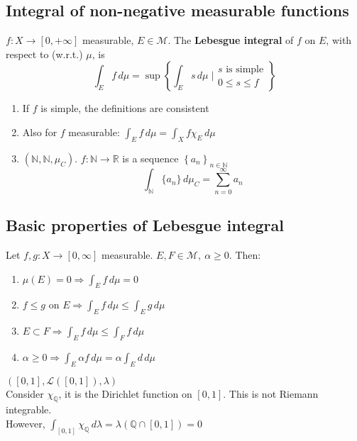 \subsection{Integral of non-negative measurable functions}
\begin{definition}
    \(f:X \to [0, +\infty]\) measurable, \(E \in \mathcal{M}\). The \textbf{Lebesgue integral} of \(f\) on \(E\), with respect to (w.r.t.) \(\mu\), is 
    \[
        \int_E f \, d\mu = \sup \left\{ \int_E s \, d\mu \; \bigg\lvert \begin{array}{l}s\text{ is simple} \\ 0 \leq s \leq f \end{array}\right\}
    \]
\end{definition}

\begin{enumerate}
    \item If \(f \) is simple, the definitions are consistent
    \item Also for \(f\) measurable: \( \int_E f \, d\mu = \int_X f \chi_E \, d\mu\)
    \item \( \left( \mathbb{N}, \mathcal{\mathbb{N}}, \mu_C \right)\). \(f: \mathbb{N} \to \mathbb{R}\) is a sequence \( \left\{ a_n \right\}_{n \in \mathbb{N}}\) \[ \int_\mathbb{N} \{a_n\} \, d\mu_C = \sum_{n=0}^\infty a_n\]
\end{enumerate}

\subsection{Basic properties of Lebesgue integral}

Let \(f, g : X \to \left[0, \infty\right]\) measurable. \(E, F \in \mathcal{M}, \ \alpha \geq 0\). Then: 
\begin{enumerate}
    \item \(\mu(E)=0 \Rightarrow \int_E f \, d\mu = 0\)
    \item \(f \leq g \) on \(E \Rightarrow \int_E f \, d\mu \leq \int_E g \, d\mu \)
    \item \(E \subset F \Rightarrow \int_E f \, d\mu \leq \int_F f \, d\mu\)
    \item \(\alpha \geq 0 \Rightarrow \int_E \alpha f \, d\mu = \alpha \int_E d \, d\mu\)
\end{enumerate}

\begin{remark}
    \(\left(\left[0, 1\right], \mathcal{L}(\left[0, 1\right]), \lambda  \right)\) \\
    Consider \(\chi_\mathbb{Q}\), it is the Dirichlet function on \(\left[0, 1\right]\). This is not Riemann integrable. \\ 
    However, \(\int_{\left[0,1\right]} \chi_{\mathbb{Q}} \, d\lambda = \lambda \left( \mathbb{Q} \cap \left[0,1\right] \right) =0 \)
\end{remark}
